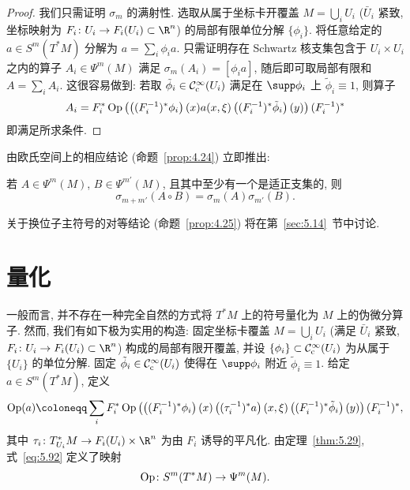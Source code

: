 \begin{proof}
我们只需证明 $\sigma_m$ 的满射性. 选取从属于坐标卡开覆盖 $M = \bigcup_i U_i$ ($\bar{U}_i$ 紧致, 坐标映射为 $F_i \colon U_i \to F_i(U_i) \subset \R^n$) 的局部有限单位分解 $\{\phi_i\}$. 将任意给定的 $a \in S^m(T^* M)$ 分解为 $a = \sum_i \phi_i a$. 只需证明存在 Schwartz 核支集包含于 $U_i \times U_i$ 之内的算子 $A_i \in \Psi^m(M)$ 满足 $\sigma_m(A_i) = [\phi_i a]$, 随后即可取局部有限和 $A = \sum_i A_i$. 这很容易做到: 若取 $\tilde{\phi}_i \in \mathcal{C}_{\mathrm{c}}^\infty(U_i)$ 满足在 $\supp\phi_i$ 上 $\tilde{\phi}_i \equiv 1$, 则算子
\begin{equation}\label{eq:5.90}
    A_i = F_i^* \operatorname{Op}\left( \left( (F_i^{-1})^* \phi_i \right)(x) a(x, \xi) \left( (F_i^{-1})^* \tilde{\phi}_i \right)(y) \right) (F_i^{-1})^*
\end{equation}
即满足所求条件.
\end{proof}

由欧氏空间上的相应结论 (命题~\ref{prop:4.24}) 立即推出:

\begin{proposition}[主符号的乘法性]\label{prop:5.40}
若 $A \in \Psi^m(M)$, $B \in \Psi^{m'}(M)$, 且其中至少有一个是适正支集的, 则
\begin{equation}\label{eq:5.91}
    \sigma_{m+m'}(A \circ B) = \sigma_m(A) \sigma_{m'}(B).
\end{equation}
\end{proposition}

关于换位子主符号的对等结论 (命题~\ref{prop:4.25}) 将在第~\ref{sec:5.14}~节中讨论.

\section{量化}\label{sec:5.6}
%

一般而言, 并不存在一种完全自然的方式将 $T^* M$ 上的符号量化为 $M$ 上的伪微分算子. 然而, 我们有如下极为实用的构造: 固定坐标卡覆盖 $M = \bigcup_i U_i$ (满足 $\bar{U}_i$ 紧致, $F_i \colon U_i \to F_i(U_i) \subset \R^n$) 构成的局部有限开覆盖, 并设 $\{\phi_i\} \subset \mathcal{C}_{\mathrm{c}}^\infty(U_i)$ 为从属于 $\{U_i\}$ 的单位分解. 固定 $\tilde{\phi}_i \in \mathcal{C}_{\mathrm{c}}^\infty(U_i)$ 使得在 $\supp\phi_i$ 附近 $\tilde{\phi}_i \equiv 1$. 给定 $a \in S^m(T^* M)$, 定义
\begin{equation}\label{eq:5.92}
    \Op(a) \defeq \sum_i F_i^* \Op\left( \left( (F_i^{-1})^* \phi_i \right)(x) \left( (\tau_i^{-1})^* a \right)(x, \xi) \left( (F_i^{-1})^* \tilde{\phi}_i \right)(y) \right) (F_i^{-1})^*,
\end{equation}
其中 $\tau_i \colon T^*_{U_i} M \to F_i(U_i) \times \R^n$ 为由 $F_i$ 诱导的平凡化. 由定理~\ref{thm:5.29}, 式~\eqref{eq:5.92} 定义了映射
\begin{equation}\label{eq:5.93}
    \operatorname{Op} \colon S^m(T^* M) \to \Psi^m(M).
\end{equation}

